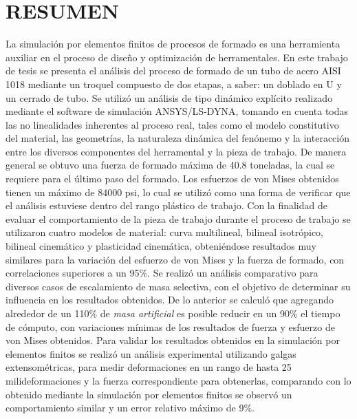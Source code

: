 \chapter*{RESUMEN}


La simulación por elementos finitos de procesos de formado es una herramienta auxiliar en el proceso de 
diseño y optimización de herramentales. En este trabajo de tesis se presenta el análisis del proceso de formado 
de un tubo de acero AISI 1018 mediante un troquel compuesto de dos etapas, a saber: un doblado en U y un 
cerrado de tubo. Se utilizó un análisis de tipo dinámico explícito realizado mediante el software de simulación 
ANSYS/LS-DYNA\CR, tomando en cuenta todas las no linealidades inherentes al proceso real, tales 
como el modelo constitutivo del material, las geometrías, la naturaleza dinámica del fenónemo y la interacción 
entre los diversos componentes del herramental y la pieza de trabajo.
De manera general se obtuvo una fuerza de formado máxima de 40.8 toneladas, la cual se requiere para el último 
paso del formado. Los esfuerzos de von Mises obtenidos tienen un máximo de 84000 psi, lo cual se utilizó 
como una forma de verificar que el análisis estuviese dentro del rango plástico de trabajo.
Con la finalidad de evaluar el comportamiento de la pieza de trabajo durante el proceso de trabajo se 
utilizaron cuatro modelos de material: curva multilineal, bilineal isotrópico, bilineal cinemático y 
plasticidad cinemática, obteniéndose resultados muy similares para la variación del esfuerzo de von Mises 
y la fuerza de formado, con correlaciones superiores a un 95\%. 
Se realizó un análisis comparativo para diversos casos de escalamiento de masa selectiva, con el objetivo 
de determinar su influencia en los resultados obtenidos. De lo anterior se calculó que agregando alrededor de 
un 110\% de \textit{masa artificial} es posible reducir en un 90\% el tiempo de cómputo, con variaciones mínimas 
de los resultados de fuerza y esfuerzo de von Mises obtenidos. Para validar los resultados obtenidos en la simulación 
por elementos finitos se realizó un análisis experimental utilizando 
galgas extensométricas, para medir deformaciones en un rango de hasta 25 milideformaciones y la fuerza correspondiente 
para obtenerlas, comparando con lo obtenido mediante la simulación por elementos finitos se observó un 
comportamiento similar y un error relativo máximo de 9\%.
